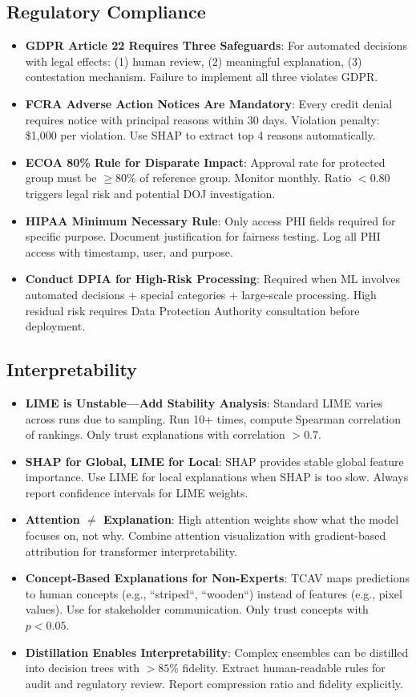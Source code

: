 \subsection{Regulatory Compliance}
\begin{itemize}
    \item \textbf{GDPR Article 22 Requires Three Safeguards}: For automated decisions with legal effects: (1) human review, (2) meaningful explanation, (3) contestation mechanism. Failure to implement all three violates GDPR.
    \item \textbf{FCRA Adverse Action Notices Are Mandatory}: Every credit denial requires notice with principal reasons within 30 days. Violation penalty: \$1,000 per violation. Use SHAP to extract top 4 reasons automatically.
    \item \textbf{ECOA 80\% Rule for Disparate Impact}: Approval rate for protected group must be $\geq 80\%$ of reference group. Monitor monthly. Ratio $< 0.80$ triggers legal risk and potential DOJ investigation.
    \item \textbf{HIPAA Minimum Necessary Rule}: Only access PHI fields required for specific purpose. Document justification for fairness testing. Log all PHI access with timestamp, user, and purpose.
    \item \textbf{Conduct DPIA for High-Risk Processing}: Required when ML involves automated decisions + special categories + large-scale processing. High residual risk requires Data Protection Authority consultation before deployment.
\end{itemize}

\subsection{Interpretability}
\begin{itemize}
    \item \textbf{LIME is Unstable---Add Stability Analysis}: Standard LIME varies across runs due to sampling. Run 10+ times, compute Spearman correlation of rankings. Only trust explanations with correlation $> 0.7$.
    \item \textbf{SHAP for Global, LIME for Local}: SHAP provides stable global feature importance. Use LIME for local explanations when SHAP is too slow. Always report confidence intervals for LIME weights.
    \item \textbf{Attention $\neq$ Explanation}: High attention weights show what the model focuses on, not why. Combine attention visualization with gradient-based attribution for transformer interpretability.
    \item \textbf{Concept-Based Explanations for Non-Experts}: TCAV maps predictions to human concepts (e.g., ``striped``, ``wooden``) instead of features (e.g., pixel values). Use for stakeholder communication. Only trust concepts with $p < 0.05$.
    \item \textbf{Distillation Enables Interpretability}: Complex ensembles can be distilled into decision trees with $> 85\%$ fidelity. Extract human-readable rules for audit and regulatory review. Report compression ratio and fidelity explicitly.
\end{itemize}

